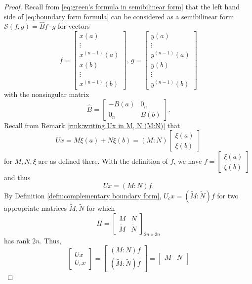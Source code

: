 \documentclass[10.5pt, oneside, a4paper]{article}
\begin{document}
\begin{proof}
    {\color{blue}
    Recall from \eqref{eq:green's formula in semibilinear form} that the left hand side of \eqref{eq:boundary form formula} can be considered as a semibilinear form $\mathcal{S}(f,g)=\hat{B}f\cdot g$ for vectors
    \[
        f=
        \begin{bmatrix}
            x(a)\\
            \vdots\\
            x^{(n-1)}(a)\\
            x(b)\\
            \vdots\\
            x^{(n-1)}(b)
        \end{bmatrix},\,
        g=
        \begin{bmatrix}
            y(a)\\
            \vdots\\
            y^{(n-1)}(a)\\
            y(b)\\
            \vdots\\
            y^{(n-1)}(b)
        \end{bmatrix}
    \]
    with the nonsingular matrix
    \[
        \hat{B}=
        \begin{bmatrix}
            -B(a) & 0_n\\
            0_n & B(b)
        \end{bmatrix}.
    \]
    Recall from Remark \ref{rmk:writing Ux in M, N (M:N)} that 
    \[Ux = M\xi(a) + N\xi(b) = (M:N)\begin{bmatrix}\xi(a)\\ \xi(b)\end{bmatrix}\]
    for $M, N, \xi$ are as defined there. With the definition of $f$, we have $f=\begin{bmatrix}\xi(a)\\ \xi(b)\end{bmatrix}$ and thus
    \[Ux = (M:N)f.\]
    By Definition \ref{defn:complementary boundary form}, $U_c x = (\tilde{M}:\tilde{N})f$ for two appropriate matrices $\tilde{M}, \tilde{N}$ for which
    \[H = \begin{bmatrix}M & N\\
    \tilde{M} & \tilde{N}\end{bmatrix}_{2n\times 2n}\]
    has rank $2n$. Thus,
    \[\begin{bmatrix}Ux\\ U_cx\end{bmatrix} = \begin{bmatrix}(M:N)f\\(\tilde{M}:\tilde{N})f\end{bmatrix} = \begin{bmatrix}M & N\\

\end{bmatrix}\]}
\end{proof}
\end{document}
